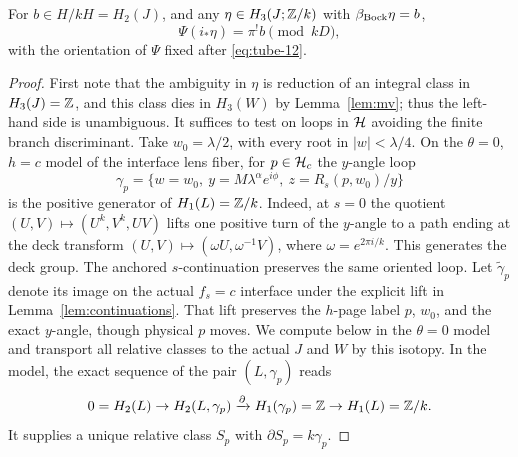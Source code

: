 \begin{lemma}\label{lem:bock}
For \(b\in H/kH=H_2(J)\), and any
\(\eta\in H_3(J;\mathbb Z/k)\) with \(\beta_{\rm Bock}\eta=b\),
\begin{equation}
\Psi(i_*\eta)=\pi^!b\pmod{kD},
\label{eq:tube-14}
\end{equation}
with the orientation of \(\Psi\) fixed after \eqref{eq:tube-12}.
\end{lemma}
\begin{proof}
First note that the ambiguity in \(\eta\) is reduction of
an integral class in \(H_3(J)=\mathbb Z\), and this class dies
in \(H_3(W)\) by Lemma~\ref{lem:mv}; thus the left-hand
side is unambiguous. It suffices to test on loops in
\(\mathcal H\) avoiding the finite branch discriminant.
Take \(w_0=\lambda/2\), with every root in
\(|w|<\lambda/4\). On the \(\theta=0\), \(h=c\)
model of the interface lens fiber, for \(p\in\mathcal H_c\)
the \(y\)-angle loop
\[
\gamma_p
=\{w=w_0,\ y=M\lambda^\alpha e^{i\phi},\
z=R_s(p,w_0)/y\}
\]
is the positive generator of \(H_1(L)=\mathbb Z/k\).
Indeed, at \(s=0\) the quotient
\((U,V)\mapsto(U^k,V^k,UV)\) lifts one positive turn of the
\(y\)-angle to a path ending at the deck transform
\((U,V)\mapsto(\omega U,\omega^{-1}V)\), where
\(\omega=e^{2\pi i/k}\). This generates the deck group.
The anchored \(s\)-continuation preserves the same oriented loop.
Let \(\widetilde\gamma_p\) denote its image on the actual
\(f_s=c\) interface under the explicit lift in
Lemma~\ref{lem:continuations}. That lift preserves the
\(h\)-page label \(p\), \(w_0\), and the exact \(y\)-angle,
though physical \(p\) moves. We compute below in the
\(\theta=0\) model and transport all relative classes to
the actual \(J\) and \(W\) by this isotopy. In the model,
the exact sequence of the pair \((L,\gamma_p)\) reads
\[
0=H_2(L)\to H_2(L,\gamma_p)
\xrightarrow{\partial}H_1(\gamma_p)=\mathbb Z
\to H_1(L)=\mathbb Z/k.
\]
It supplies a unique relative class \(S_p\) with
\(\partial S_p=k\gamma_p\).


\end{proof}
